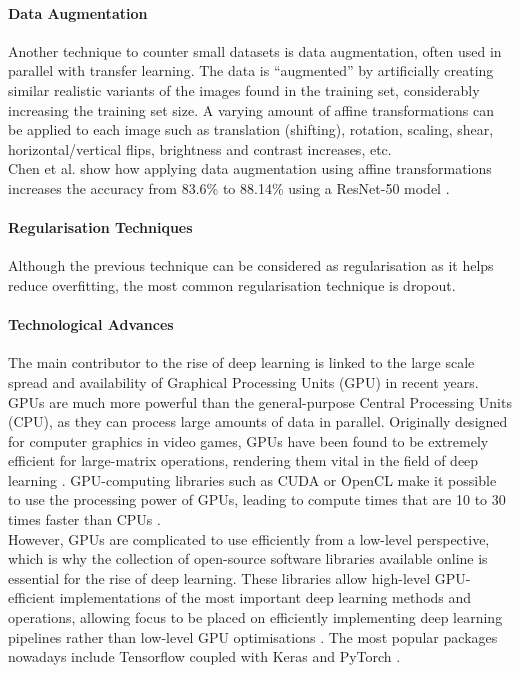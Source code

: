 \paragraph{Data Augmentation}
\label{sec:litsurvey-data-augmentation}

Another technique to counter small datasets is data augmentation, often used in parallel with transfer learning. The data is ``augmented'' by artificially creating similar realistic variants of the images found in the training set, considerably increasing the training set size. A varying amount of affine transformations can be applied to each image such as translation (shifting), rotation, scaling, shear, horizontal/vertical flips, brightness and contrast increases, etc.\\

Chen et al. show how applying data augmentation using affine transformations increases the accuracy from 83.6\% to 88.14\% using a ResNet-50 model \citep{Chen2019}.

\paragraph{Regularisation Techniques}

Although the previous technique can be considered as regularisation as it  helps reduce overfitting, the most common regularisation technique is dropout.

\paragraph{Technological Advances}

The main contributor to the rise of deep learning is linked to the large scale spread and availability of  Graphical Processing Units (GPU) in recent years. GPUs are much more powerful than the general-purpose Central Processing Units (CPU), as they can process large amounts of data in parallel. Originally designed for computer graphics in video games, GPUs have been found to be extremely efficient for large-matrix operations, rendering them vital in the field of deep learning \citep{Caulfield2009}. GPU-computing libraries such as CUDA or OpenCL make it possible to use the processing power of GPUs, leading to compute times that are 10 to 30 times faster than CPUs \citep{Litjens2017}.\\

However, GPUs are complicated to use efficiently from a low-level perspective, which is why the collection of open-source software libraries available online is essential for the rise of deep learning. These libraries allow high-level GPU-efficient implementations of the most important deep learning methods and operations, allowing focus to be placed on efficiently implementing deep learning pipelines rather than low-level GPU optimisations \citep{Litjens2017}. The most popular packages nowadays include Tensorflow \citep{tensorflow2015-whitepaper} coupled with Keras \citep{chollet2015keras} and PyTorch \citep{pytorch}.\\

